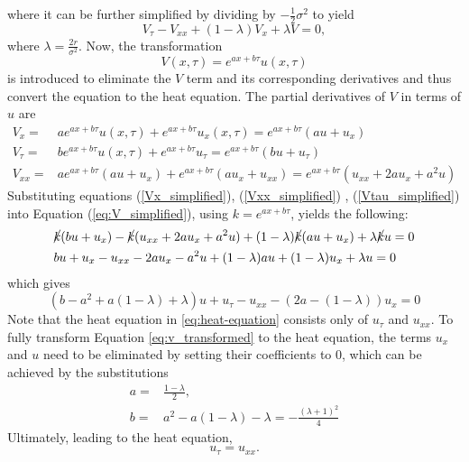 where it can be further simplified by dividing 
by $-\frac{1}{2}\sigma^2$ to yield
\begin{equation}
    V_{\tau} - V_{xx} + (1-\lambda)V_x + \lambda V = 0, \label{eq:V_simplified}
\end{equation}
where $\lambda = \frac{2r}{\sigma^2}$. 
Now, the transformation
\begin{equation}
V(x,\tau) = e^{ax+b\tau} u(x,\tau) 
\end{equation}
is introduced to eliminate the $V$ term and its corresponding derivatives and thus convert the equation to the heat equation.
The partial derivatives of $V$ in terms of $u$ are
\begin{align}
    V_x {}={}& ae^{ax+b\tau}u(x,\tau) + e^{ax+b\tau}u_x(x,\tau) = e^{ax+b\tau}(au + u_x) \label{Vx_simplified}
    \\
    V_{\tau} {}={}& be^{ax+b\tau}u(x,\tau) + e^{ax+b\tau}u_{\tau} = e^{ax+b\tau}(bu + u_{\tau}) \label{Vtau_simplified}
    \\
    V_{xx} {}={}& ae^{ax+b\tau}(au+u_x) + e^{ax+b\tau}(au_x+u_{xx}) = e^{ax+b\tau}(u_{xx} + 2au_x + a^2u) \label{Vxx_simplified}
\end{align}
Substituting equations (\ref{Vx_simplified}), (\ref{Vxx_simplified}) , (\ref{Vtau_simplified}) into Equation (\ref{eq:V_simplified}), using $k = e^{ax+b\tau}$, yields the following:
\begin{equation}
\begin{aligned}
    & \cancel{k}(bu+u_x)-\cancel{k}(u_{xx}+2au_x+a^2u)+(1-\lambda)\cancel{k}(au+u_x)+\lambda \cancel{k}u = 0 \\
    & bu + u_x - u_{xx} - 2au_x - a^2u+(1-\lambda)au +(1-\lambda)u_x+\lambda u = 0
\end{aligned}
\end{equation}
which gives
\begin{equation}
    (b-a^2+a(1-\lambda)+\lambda)u + u_\tau - u_{xx} - (2a-(1-\lambda))u_x = 0 \label{eq:v_transformed}
\end{equation}
Note that the heat equation in \eqref{eq:heat-equation} consists only of $u_\tau$ and $u_{xx}$. 
To fully transform Equation \eqref{eq:v_transformed} to the heat equation, the terms $u_x$ and $u$ need to be eliminated by setting their coefficients to 0, which can be achieved by the substitutions
\begin{align} 
a ={}& \frac{1-\lambda}{2}, \\ 
b ={}& a^2-a(1-\lambda)-\lambda = -\frac{(\lambda+1)^2}{4}
\end{align}
Ultimately, leading to the heat equation,
\begin{equation}
    u_\tau = u_{xx}.
\end{equation}

